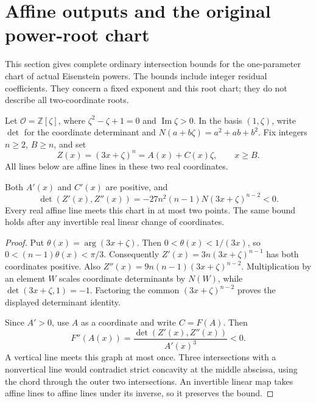 \section{Affine outputs and the original power-root chart}
\label{ai19-section}

This section gives complete ordinary intersection bounds for the
one-parameter chart of actual Eisenstein powers. The bounds include
integer residual coefficients. They concern a fixed exponent and this
root chart; they do not describe all two-coordinate roots.

Let \(\mathcal O=\mathbb Z[\zeta]\), where
\(\zeta^2-\zeta+1=0\) and \(\operatorname{Im}\zeta>0\). In the basis
\((1,\zeta)\), write \(\det\) for the coordinate determinant and
\(N(a+b\zeta)=a^2+ab+b^2\). Fix integers \(n\ge2\), \(B\ge n\), and set
\[
 Z(x)=(3x+\zeta)^n=A(x)+C(x)\zeta,\qquad x\ge B.
\]
All lines below are affine lines in these two real coordinates.

\begin{proposition}
\label{ai19-curvature}
Both \(A'(x)\) and \(C'(x)\) are positive, and
\[
 \det(Z'(x),Z''(x))
 =-27n^2(n-1)N(3x+\zeta)^{n-2}<0.
\]
Every real affine line meets this chart in at most two points. The same
bound holds after any invertible real linear change of coordinates.
\end{proposition}
\begin{proof}
Put \(\theta(x)=\arg(3x+\zeta)\). Then
\(0<\theta(x)<1/(3x)\), so \(0<(n-1)\theta(x)<\pi/3\).
Consequently \(Z'(x)=3n(3x+\zeta)^{n-1}\) has both coordinates positive.
Also \(Z''(x)=9n(n-1)(3x+\zeta)^{n-2}\).
Multiplication by an element \(W\) scales coordinate determinants by
\(N(W)\), while \(\det(3x+\zeta,1)=-1\). Factoring the common
\((3x+\zeta)^{n-2}\) proves the displayed determinant identity.

Since \(A'>0\), use \(A\) as a coordinate and write \(C=F(A)\). Then
\[
 F''(A(x))=\frac{\det(Z'(x),Z''(x))}{A'(x)^3}<0.
\]
A vertical line meets this graph at most once. Three intersections
with a nonvertical line would contradict strict concavity at the
middle abscissa, using the chord through the outer two intersections.
An invertible linear map takes affine lines to affine lines under its
inverse, so it preserves the bound.
\end{proof}

